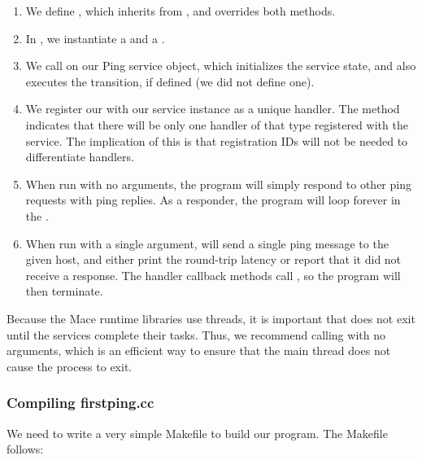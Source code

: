 \begin{enumerate}

\item We define , which inherits from
  , and overrides both methods.

\item In , we instantiate a
   and a .

\item We call  on our Ping service object, which
  initializes the service state, and also executes the
   transition, if defined (we did not define one).

\item We register our  with our service
  instance as a unique handler.  The 
  method indicates that there will be only one handler of that type
  registered with the service.  The implication of this is that
  registration IDs will not be needed to differentiate handlers.

\item When run with no arguments, the program will simply respond to
  other ping requests with ping replies.  As a responder, the program
  will loop forever in the .

\item When run with a single argument,  will send a
  single ping message to the given host, and either print the
  round-trip latency or report that it did not receive a response.
  The handler callback methods call , so the program
  will then terminate.

\end{enumerate}

Because the Mace runtime libraries use threads, it is important that
 does not exit until the services complete their
tasks.  Thus, we recommend calling  with
no arguments, which is an efficient way to ensure that the main thread
does not cause the process to exit.

\subsubsection{Compiling firstping.cc}
\label{sec:compiling-ping-cc}

We need to write a very simple Makefile to build our program.  The
Makefile  follows:

